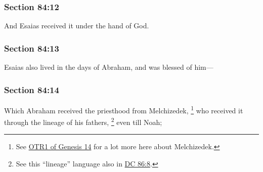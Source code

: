 
	\subsubsection{Section 84:12} %
		\label{DC84-12}

		And Esaias received it under the hand of God.


	\subsubsection{Section 84:13} %
		\label{DC84-13}

		Esaias also lived in the days of Abraham, and was blessed of him---


	\subsubsection{Section 84:14} %
		\label{DC84-14}

		Which Abraham received the priesthood from Melchizedek,%
			\footnote{%
				See \hyperref[JST-OTR1-GENESIS-14]{OTR1 of Genesis 14} for a lot more here about Melchizedek.
				}
		who received it through the lineage of his fathers,%
			\footnote{%
				See this ``lineage'' language also in \hyperref[DC86-8]{DC 86:8}.
				}
		even till Noah;

